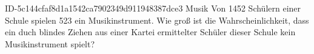 \begin{exercise}
      {ID-5c144cfaf8d1a1542ca7902349d911948387dce3}
      {Musik}
  \ifproblem\problem
    Von \num{1452} Schülern einer Schule spielen \num{523} ein Musikinstrument.
    Wie groß ist die Wahrscheinlichkeit, dass ein duch blindes Ziehen aus
    einer Kartei ermittelter Schüler dieser Schule kein Musikinstrument
    spielt?
  \fi
\end{exercise}
